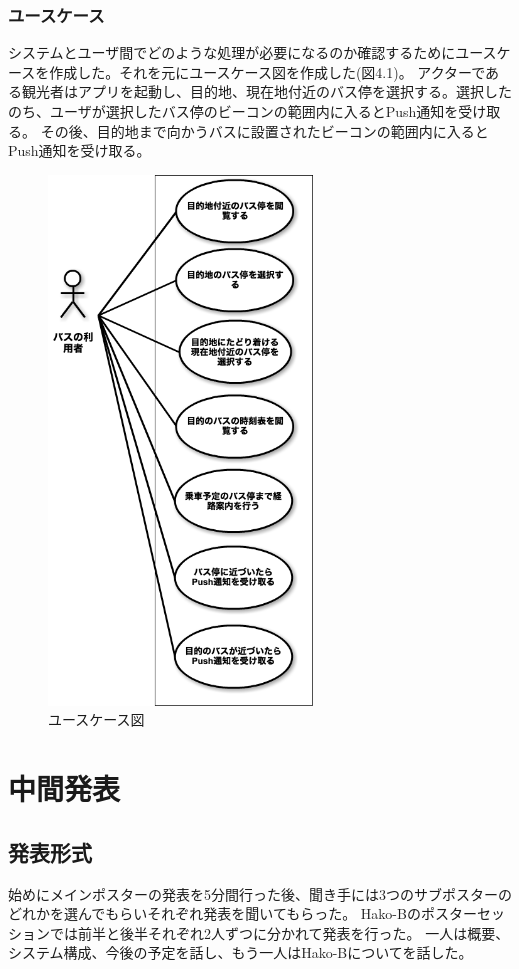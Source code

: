 \documentclass[openany,11pt,papersize]{jsbook}
\begin{document}

\subsection{ユースケース}
システムとユーザ間でどのような処理が必要になるのか確認するためにユースケースを作成した。それを元にユースケース図を作成した(図4.1)。
アクターである観光者はアプリを起動し、目的地、現在地付近のバス停を選択する。選択したのち、ユーザが選択したバス停のビーコンの範囲内に入るとPush通知を受け取る。
その後、目的地まで向かうバスに設置されたビーコンの範囲内に入るとPush通知を受け取る。

\begin{figure}[htbp]
  \begin{center}
    \includegraphics[clip,width=7.0cm]{img/usecase.png}
    \caption{ユースケース図}
    \label{fig:usecase}
  \end{center}
\end{figure}


\chapter{中間発表}

\section{発表形式}
始めにメインポスターの発表を5分間行った後、聞き手には3つのサブポスターのどれかを選んでもらいそれぞれ発表を聞いてもらった。
Hako-Bのポスターセッションでは前半と後半それぞれ2人ずつに分かれて発表を行った。
一人は概要、システム構成、今後の予定を話し、もう一人はHako-Bについてを話した。
\end{document}
